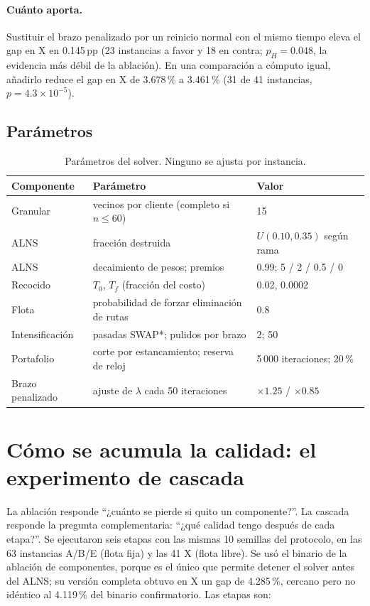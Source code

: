 \documentclass[11pt,a4paper]{article}
\newcommand{\pp}{\,pp}
\begin{document}
\paragraph{Cuánto aporta.} Sustituir el brazo penalizado por un reinicio normal con el mismo tiempo
eleva el gap en X en 0.145\pp{} (23 instancias a favor y 18 en contra; $p_H=0.048$, la evidencia más
débil de la ablación). En una comparación a cómputo igual, añadirlo reduce el gap en X de 3.678\,\% a
3.461\,\% (31 de 41 instancias, $p=4.3\times10^{-5}$).

\subsection{Parámetros}
\begin{table}[H]
\centering
\caption{Parámetros del solver. Ninguno se ajusta por instancia.}
\label{tab:parametros}
\small
\begin{tabular}{@{}lll@{}}
\toprule
Componente & Parámetro & Valor \\
\midrule
Granular & vecinos por cliente (completo si $n\le60$) & 15 \\
ALNS & fracción destruida & $U(0.10,0.35)$ según rama \\
ALNS & decaimiento de pesos; premios & 0.99; 5 / 2 / 0.5 / 0 \\
Recocido & $T_0$, $T_f$ (fracción del costo) & 0.02, 0.0002 \\
Flota & probabilidad de forzar eliminación de rutas & 0.8 \\
Intensificación & pasadas SWAP*; pulidos por brazo & 2; 50 \\
Portafolio & corte por estancamiento; reserva de reloj & 5\,000 iteraciones; 20\,\% \\
Brazo penalizado & ajuste de $\lambda$ cada 50 iteraciones & $\times1.25$ / $\times0.85$ \\
\bottomrule
\end{tabular}
\end{table}

\section{Cómo se acumula la calidad: el experimento de cascada}
\label{sec:cascada}

La ablación responde ``¿cuánto se pierde si quito un componente?''. La cascada responde la pregunta
complementaria: ``¿qué calidad tengo después de cada etapa?''. Se ejecutaron seis etapas con las
mismas 10 semillas del protocolo, en las 63 instancias A/B/E (flota fija) y las 41 X (flota libre).
Se usó el binario de la ablación de componentes, porque es el único que permite detener el solver
antes del ALNS; su versión completa obtuvo en X un gap de 4.285\,\%, cercano pero no idéntico al
4.119\,\% del binario confirmatorio. Las etapas son:
\end{document}
